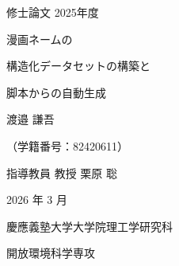 \documentclass[a4j,10.5pt,dvipdfmx]{jsreport}
\begin{document}
\renewcommand{\abstractname}{\LARGE 論文要旨}

\begin{titlepage}
   \noindent
   {\Large 修士論文} \hfill {\Large 2025年度}

   \vspace*{70truept}

   \begin{center}
      \vspace{60truept}
      {\Huge \bfseries 
      \strut 漫画ネームの \\
      \strut 構造化データセットの構築と \\
      \strut 脚本からの自動生成} \par

      \vspace{90truept}

      {\LARGE 渡邉 謙吾} \par
      \vspace{5truept}
      {\LARGE （学籍番号：82420611）} \par

      \vspace{90truept}

      {\LARGE 指導教員 教授 栗原 聡} \par

      \vspace{30truept}

      {\Large 2026 年 3 月 } \par

      \vspace{30truept}

      {\Large 慶應義塾大学大学院理工学研究科} \par
      \vspace{10truept}
      {\Large 開放環境科学専攻} \par
   \end{center}
\end{titlepage}



\clearpage
{}

\tableofcontents
\thispagestyle{chapterstart} %

\listoffigures
\thispagestyle{chapterstart} %

\listoftables
\thispagestyle{chapterstart} %
\end{document}
